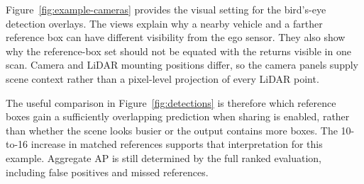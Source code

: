 Figure~\ref{fig:example-cameras} provides the visual setting for the
bird's-eye detection overlays. The views explain why a nearby vehicle and
a farther reference box can have different visibility from the ego sensor.
They also show why the reference-box set should not be equated with the
returns visible in one scan. Camera and LiDAR mounting positions differ,
so the camera panels supply scene context rather than a pixel-level
projection of every LiDAR point.

The useful comparison in Figure~\ref{fig:detections} is therefore which
reference boxes gain a sufficiently overlapping prediction when sharing
is enabled, rather than whether the scene looks busier or the output
contains more boxes. The 10-to-16 increase in matched references supports
that interpretation for this example. Aggregate AP is still determined by
the full ranked evaluation, including false positives and missed references.
